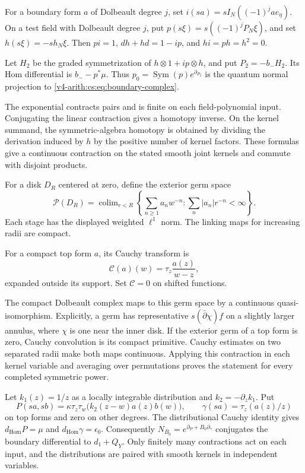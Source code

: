 For a boundary form \(a\) of Dolbeault degree \(j\), set
\(i(sa)=sI_N((-1)^jae_\eta)\). On a test field with Dolbeault degree \(j\),
put \(p(s\xi)=s((-1)^jP_N\xi)\), and set \(h(s\xi)=-s h_N\xi\). Then
\(pi=1\), \(dh+hd=1-ip\), and \(hi=ph=h^2=0\).

Let \(H_2\) be the graded symmetrization of \(h\otimes1+ip\otimes h\), and
put \(P_2=-b_-H_2\). Its Hom differential is \(b_--p^*\mu\). Thus
\(p_0=\operatorname{Sym}(p)e^{\partial_{P_2}}\) is the quantum normal
projection to \eqref{v4-arith:cs:eq:boundary-complex}.

The exponential contracts pairs and is finite on each field-polynomial
input. Conjugating the linear contraction gives a homotopy inverse. On the
kernel summand, the symmetric-algebra homotopy is obtained by dividing the
derivation induced by \(h\) by the positive number of kernel factors. These
formulas give a continuous contraction on the stated smooth joint kernels
and commute with disjoint products.

For a disk \(D_R\) centered at zero, define the exterior germ space
\[
 \mathscr P(D_R)=\operatorname{colim}_{r<R}
  \left\{\sum_{n\ge1}a_nw^{-n}:
                     \sum_n|a_n|r^{-n}<\infty\right\}.
\]
Each stage has the displayed weighted \(\ell^1\) norm. The linking maps for
increasing radii are compact.

For a compact top form \(a\), its Cauchy transform is
\[
 \mathcal C(a)(w)=\tau_z\frac{a(z)}{w-z},
\]
expanded outside its support. Set \(\mathcal C=0\) on shifted functions.

The compact Dolbeault complex maps to this germ space by a continuous
quasi-isomorphism. Explicitly, a germ has representative
\(s(\bar\partial\chi)f\) on a slightly larger annulus, where \(\chi\) is one
near the inner disk. If the exterior germ of a top form is zero, Cauchy
convolution is its compact primitive. Cauchy estimates on two separated
radii make both maps continuous. Applying this contraction in each kernel
variable and averaging over permutations proves the statement for every
completed symmetric power.

Let \(k_1(z)=1/z\) as a locally integrable distribution and
\(k_2=-\partial_zk_1\). Put
\[
 P(sa,sb)=\kappa\tau_z\tau_w
                  \bigl(k_2(z-w)a(z)b(w)\bigr),
 \qquad \gamma(sa)=\tau_z(a(z)/z)
\]
on top forms and zero on other degrees. The distributional Cauchy identity
gives \(d_{\mathrm{Hom}}P=\mu\) and \(d_{\mathrm{Hom}}\gamma=\epsilon_0\).
Consequently \(N_{B_0}=e^{\partial_P+B_0\partial_\gamma}\) conjugates the
boundary differential to \(d_1+Q_Y\). Only finitely many contractions act on
each input, and the distributions are paired with smooth kernels in
independent variables.

